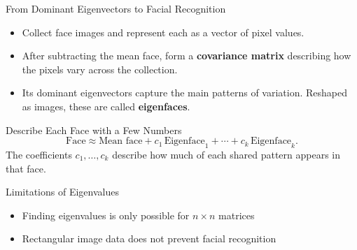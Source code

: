 \documentclass[10pt]{beamer}
\begin{document}
\begin{frame}{From Dominant Eigenvectors to Facial Recognition}

\begin{itemize}
    \item Collect face images and represent each as a vector
    of pixel values.

    \item After subtracting the mean face, form a
    \textbf{covariance matrix} describing how the pixels vary
    across the collection.

    \item Its dominant eigenvectors capture the main patterns
    of variation. Reshaped as images, these are called
    \textbf{eigenfaces}.
\end{itemize}

\begin{block}{Describe Each Face with a Few Numbers}
\[
    \text{Face}
    \approx
    \text{Mean face}
    + c_1\,\text{Eigenface}_1
    + \cdots
    + c_k\,\text{Eigenface}_k.
\]
The coefficients $c_1,\ldots,c_k$ describe how much of each
shared pattern appears in that face.
\end{block}



\end{frame}

\begin{frame}{Limitations of Eigenvalues}
\begin{itemize}
   {}
   \vspace{3mm}

    \item Finding eigenvalues is only possible for $n\times n$ matrices\\[3mm] 

    \item Rectangular image data does not prevent facial recognition\\[3mm]

\end{itemize}
    
\end{frame}
\end{document}
